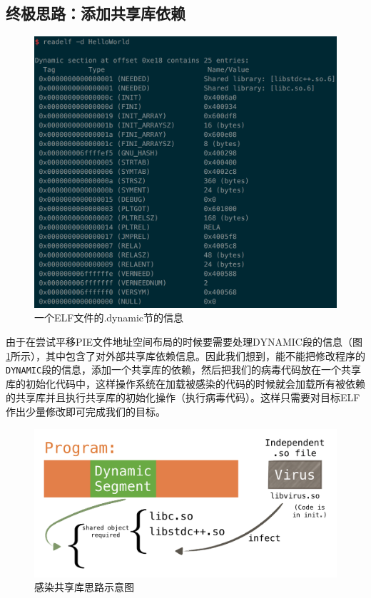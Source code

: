 \documentclass[a4paper, 11pt]{article}
\begin{document}
\subsection{终极思路：添加共享库依赖}
\begin{figure}
	\centering
	\includegraphics[width=\textwidth]{figures/elf-dynamic-section}
	\caption{一个ELF文件的.dynamic节的信息}
	\label{fig:elf-dynamic}
\end{figure}
由于在尝试平移PIE文件地址空间布局的时候要需要处理DYNAMIC段的信息（图\ref{fig:elf-dynamic}所示），其中包含了对外部共享库依赖信息。因此我们想到，能不能把修改程序的\texttt{DYNAMIC}段的信息，添加一个共享库的依赖，然后把我们的病毒代码放在一个共享库的初始化代码中，这样操作系统在加载被感染的代码的时候就会加载所有被依赖的共享库并且执行共享库的初始化操作（执行病毒代码）。这样只需要对目标ELF作出少量修改即可完成我们的目标。

\begin{figure}[htbp]
		\centering
		\includegraphics[width =0.7 \textwidth]{figures/fig4_ld1}
		\caption{感染共享库思路示意图}
		\label{fig:way4}
\end{figure}
\end{document}
